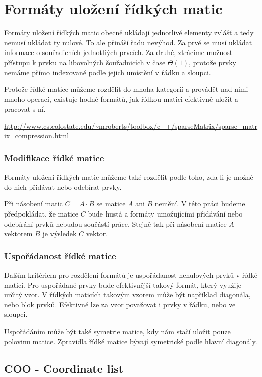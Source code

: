 \chapter{Formáty uložení řídkých matic}


Formáty uložení řídkých matic obecně ukládají jednotlivé elementy zvlášť a tedy nemusí ukládat ty nulové. To ale přináší řadu nevýhod. Za prvé se musí ukládat informace o souřadicních jednotliých prvcích. Za druhé, ztrácíme možnost přístupu k prvku na libovolných šouřadnicích v čase $\Theta(1)$, protože prvky nemáme přímo indexované podle jejich umístění v řádku a sloupci.

Protože řídké matice můžeme rozdělit do mnoha kategorií a provádět nad nimi mnoho operací, existuje hodně formátů, jak řídkou matici efektivně uložit a pracovat s ní.

\url{http://www.cs.colostate.edu/~mroberts/toolbox/c++/sparseMatrix/sparse_matrix_compression.html}

\subsection{Modifikace řídké matice}

Formáty uložení řídkých matic můžeme také rozdělit podle toho, zda-li je možné do nich přidávat nebo odebírat prvky.

Při násobení matic $C = A \cdot B$ se matice $A$ ani $B$ nemění. V této práci budeme předpokládat, že matice $C$ bude hustá a formáty umožujícími přidávání nebo odebírání prvků nebudou součástí práce. Stejně tak při násobení matice $A$ vektorem $B$ je výsledek $C$ vektor.

\subsection{Uspořádanost řídké matice}

Dalším kritériem pro rozdělení formátů je uspořádanost nenulových prvků v řídké matici. Pro uspořádané prvky bude efektivnější takový formát, který využije určitý vzor. V řídkých maticích takovým vzorem může být například diagonála, nebo blok prvků. Efektivně lze za vzor považovat i prvky v řádku, nebo ve sloupci.

Uspořádáním může být také symetrie matice, kdy nám stačí uložit pouze polovinu matice. Zpravidla řídké matice bývají symetrické podle hlavní diagonály.

\section{COO - Coordinate list}

